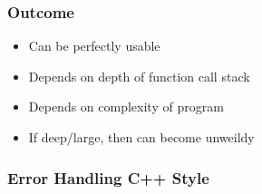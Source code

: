 \begin{Shaded}
\begin{Highlighting}[]
   
\NormalTok{\{}
  
  \NormalTok{\{}
     \NormalTok{;}
  \NormalTok{\} }  
     \NormalTok{;}
  \NormalTok{\} } \NormalTok{\{}
     \NormalTok{;}
  \NormalTok{\}}
\NormalTok{\}}

   
\NormalTok{\{}
  
  \NormalTok{) }
   \NormalTok{) }
 \NormalTok{\{}
 \NormalTok{\}}
\NormalTok{\} }
\end{Highlighting}
\end{Shaded}

\subsubsection{Outcome}\label{outcome}

\begin{itemize}
\itemsep1pt\parskip0pt
\item
  Can be perfectly usable
\item
  Depends on depth of function call stack
\item
  Depends on complexity of program
\item
  If deep/large, then can become unweildy
\end{itemize}

\subsubsection{Error Handling C++ Style}\label{error-handling-c-style-1}

